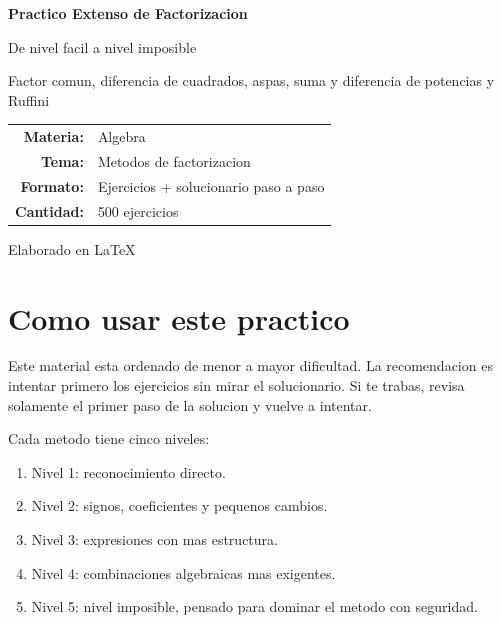 \documentclass[11pt,a4paper]{article}
\begin{document}
\begin{titlepage}
\centering
{\Huge\bfseries Practico Extenso de Factorizacion\par}
\vspace{0.7cm}
{\Large De nivel facil a nivel imposible\par}
\vspace{1cm}
{\large Factor comun, diferencia de cuadrados, aspas, suma y diferencia de potencias y Ruffini\par}
\vfill
\begin{tabular}{rl}
\textbf{Materia:} & Algebra \\
\textbf{Tema:} & Metodos de factorizacion \\
\textbf{Formato:} & Ejercicios + solucionario paso a paso \\
\textbf{Cantidad:} & 500 ejercicios \\
\end{tabular}
\vfill
{\large Elaborado en \LaTeX\par}
\end{titlepage}
\tableofcontents
\newpage
\section*{Como usar este practico}
Este material esta ordenado de menor a mayor dificultad. La recomendacion es intentar primero los ejercicios sin mirar el solucionario. Si te trabas, revisa solamente el primer paso de la solucion y vuelve a intentar.

Cada metodo tiene cinco niveles:
\begin{enumerate}
\item Nivel 1: reconocimiento directo.
\item Nivel 2: signos, coeficientes y pequenos cambios.
\item Nivel 3: expresiones con mas estructura.
\item Nivel 4: combinaciones algebraicas mas exigentes.
\item Nivel 5: nivel imposible, pensado para dominar el metodo con seguridad.
\end{enumerate}

\newpage
\end{document}
